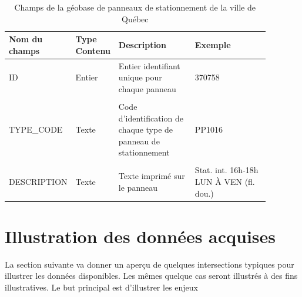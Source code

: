 \begin{landscape}
\begin{table}[h!]
  \centering
   \begin{tabular}{p{0.18\linewidth} | p{0.1\linewidth} | p{0.3\linewidth} | p{0.3\linewidth}} 
   \hline
   Nom du champs & Type Contenu & Description  & Exemple\\ 
   \hline
   ID             & Entier    & Entier identifiant unique pour chaque panneau  & 370758 \\ 
   & & & \\
   TYPE\_CODE      & Texte     & Code d'identification de chaque type de panneau de stationnement & PP1016\\
   & & & \\
   DESCRIPTION     & Texte     & Texte imprimé sur le panneau & Stat. int. 16h-18h LUN À VEN (fl. dou.)\\
   \hline
   \end{tabular}
   \caption{Champs de la géobase de panneaux de stationnement de la ville de Québec \parencite{VilledeQuebec:PanneauxSignalisation:2024}}
   \label{tab:champs_geobase_stationnement_quebec}
\end{table}
\end{landscape}

\section{Illustration des données acquises}
La section suivante va donner un aperçu de quelques intersections typiques pour illustrer les données disponibles. Les mêmes quelque cas seront illustrés à des fins illustratives. Le but principal est d'illustrer les enjeux
